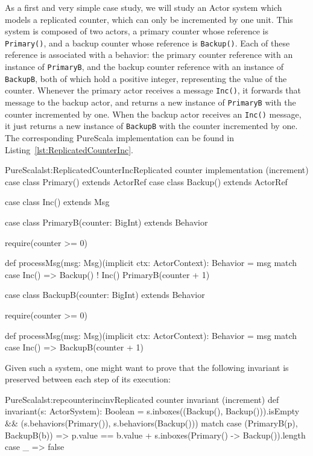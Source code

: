\documentclass[a4paper,twoside]{article}
\newcommand{\RefCode}[1]{Listing~\ref{#1}}
\newcommand{\stt}[1]{\texttt{\small{#1}}}
\begin{document}
As a first and very simple case study, we will study an Actor system which models a
replicated counter, which can only be incremented by one unit. This system is 
composed of two actors, a primary counter whose reference is \stt{Primary()},
and a backup counter whose reference is \stt{Backup()}.
Each of these reference is associated with a behavior: the primary counter reference with
an instance of \stt{PrimaryB}, and the backup counter reference with an instance 
of \stt{BackupB}, both of which hold a positive integer, representing the value of the
counter. Whenever the primary actor receives a message \stt{Inc()}, it forwards that
message to the backup actor, and returns a new instance of \stt{PrimaryB} with the
counter incremented by one. When the backup actor receives an \stt{Inc()} message,
it just returns a new instance of \stt{BackupB} with the counter incremented by one. 
The corresponding PureScala implementation can be found
in \RefCode{lst:ReplicatedCounterInc}.

\begin{Code}{PureScala}{lst:ReplicatedCounterInc}{Replicated counter implementation (increment)}
case class Primary() extends ActorRef
case class Backup()  extends ActorRef

case class Inc() extends Msg

case class PrimaryB(counter: BigInt) extends Behavior {
  require(counter >= 0)

  def processMsg(msg: Msg)(implicit ctx: ActorContext): Behavior = msg match {
    case Inc() =>
      Backup() ! Inc()
      PrimaryB(counter + 1)
  }
}

case class BackupB(counter: BigInt) extends Behavior {
  require(counter >= 0)

  def processMsg(msg: Msg)(implicit ctx: ActorContext): Behavior = msg match {
    case Inc() => BackupB(counter + 1)
  }
}
\end{Code}

Given such a system, one might want to prove that the following invariant is 
preserved between each step of its execution:

\begin{Code}{PureScala}{lst:repcounterincinv}{Replicated counter invariant (increment)}
def invariant(s: ActorSystem): Boolean = {
  s.inboxes((Backup(), Backup())).isEmpty && {
    (s.behaviors(Primary()), s.behaviors(Backup())) match {
      case (PrimaryB(p), BackupB(b)) =>
        p.value == b.value + s.inboxes(Primary() -> Backup()).length
      case _ => false
    }
  }
}
\end{Code}
\end{document}
